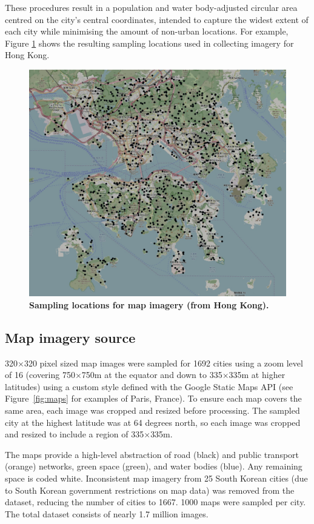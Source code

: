 \documentclass[9pt,twocolumn,twoside,lineno]{pnas-new}
\begin{document}
{These procedures result in a population and water body-adjusted circular area centred on the city's central coordinates, intended to capture the widest extent of each city while minimising the amount of non-urban locations. For example, Figure \ref{fig:parissample} shows the resulting sampling locations used in collecting imagery for Hong Kong. 

\begin{figure}
\centering
\includegraphics[width=.8\linewidth]{HongKongSamples_.png}
\caption{\bf Sampling locations for map imagery (from Hong Kong).}
 \label{fig:parissample}
\end{figure} 



\subsection*{Map imagery source}\label{methodsimagery}

320$\times$320 pixel sized map images were sampled for 1692 cities using a zoom level of 16 (covering 750$\times$750m at the equator and down to 335$\times$335m at higher latitudes) using a custom style defined with the Google Static Maps API\cite{GoogleStatic2017} (see Figure~\ref{fig:maps} for examples of Paris, France). To ensure each map covers the same area, each image was cropped and resized before processing. The sampled city at the highest latitude was at 64 degrees north, so each image was cropped and resized to include a region of 335$\times$335m. 

The maps provide a high-level abstraction of road (black) and public transport (orange) networks, green space (green), and water bodies (blue). Any remaining space is coded white. Inconsistent map imagery from 25 South Korean cities (due to South Korean government restrictions on map data\cite{Badalge2018}) was removed from the dataset, reducing the number of cities to 1667. 1000 maps were sampled per city. The total dataset consists of nearly 1.7 million images.

}
\end{document}

